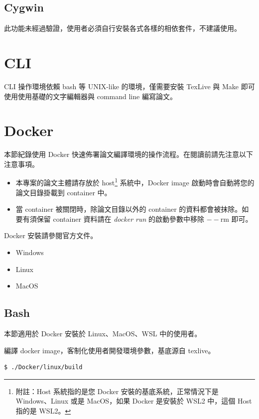 \subsection{Cygwin}

此功能未經過驗證，使用者必須自行安裝各式各樣的相依套件，不建議使用。

\section{CLI}

CLI 操作環境依賴 bash 等 UNIX-like 的環境，僅需要安裝 TexLive 與 Make 即可使用使用基礎的文字編輯器與 command line 編寫論文。

\section{Docker}

本節紀錄使用 Docker 快速佈署論文編譯環境的操作流程。在閱讀前請先注意以下注意事項。

\begin{itemize}
        \item 本專案的論文主體請存放於 host\footnote{附註：Host 系統指的是您 Docker 安裝的基底系統，正常情況下是 Windows、Linux 或是 MacOS，如果 Docker 是安裝於 WSL2 中，這個 Host 指的是 WSL2。} 系統中，Docker image 啟動時會自動將您的論文目錄掛載到 container 中。
        \item 當 container 被關閉時，除論文目錄以外的 container 的資料都會被抹除。如要有須保留 container 資料請在 \emph{docker run} 的啟動參數中移除 $--$rm 即可。
\end{itemize}

Docker 安裝請參閱官方文件。

\begin{itemize}
        \item Windows\cite{win_docker}
        \item Linux\cite{linux_docker}
        \item MacOS\cite{mac_docker}
\end{itemize}

\newpage

\subsection{Bash}

本節適用於 Docker 安裝於 Linux、MacOS、WSL 中的使用者。

編譯 docker image，客制化使用者開發環境參數，基底源自 texlive\cite{docker_texlive}。
\begin{lstlisting}[language=bash]
        $ ./Docker/linux/build
\end{lstlisting}

